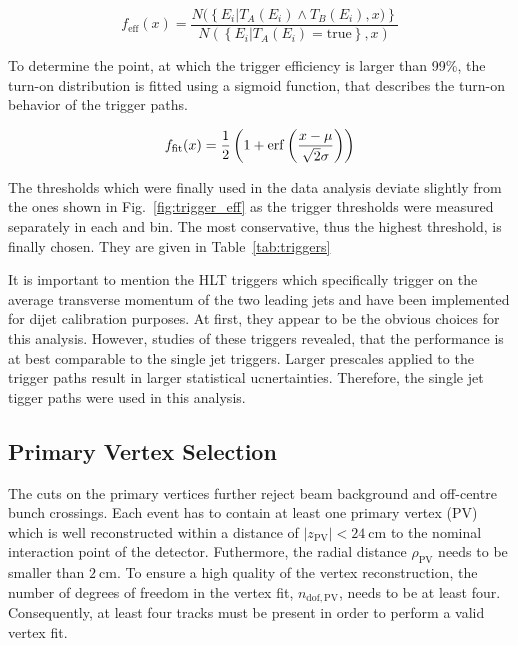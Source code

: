 \begin{equation}
\label{eq:trigger_eff}
    f_{\mathrm{eff}} (x) = \frac{N(\left\{E_i|T_A(E_i) \wedge T_B(E_i), x)\right\}}{N(\left\{ E_i | T_A(E_i) = \mathrm{true} \right\} , x)}
\end{equation}

To determine the point, at which the trigger efficiency is larger than 99\%, the
turn-on distribution is fitted using a sigmoid function, that describes the
turn-on behavior of the trigger paths.

\begin{equation}
\label{eq:trigger_eff_fit}
    f_{\mathrm{fit}} (x) = \frac{1}{2} \left( 1 + \operatorname{erf} \left(\frac{x-\mu}{\sqrt{2}\sigma}\right)\right)
\end{equation}

The thresholds which were finally used in the data analysis deviate slightly
from the ones shown in Fig.~\ref{fig:trigger_eff} as the trigger thresholds
were measured separately in each \ystar and \yboost bin. The most
conservative, thus the highest threshold, is finally chosen. They are given in
Table~\ref{tab:triggers}

It is important to mention the HLT triggers which specifically trigger on the
average transverse momentum of the two leading jets and have been implemented
for dijet calibration purposes. At first, they appear to be the obvious choices
for this analysis. However, studies of these triggers revealed, that the
performance is at best comparable to the single jet triggers. Larger prescales
applied to the \ptavg trigger paths result in larger statistical ucnertainties.
Therefore, the single jet tigger paths were used in this analysis.

\subsection{Primary Vertex Selection}

The cuts on the primary vertices further reject beam background and off-centre bunch
crossings. Each event has to contain at least one primary vertex (PV) which is well
reconstructed within a distance of $|z_\mathrm{PV}| < \SI{24}{\centi \meter}$ to
the nominal interaction point of the detector. Futhermore, the radial distance
$\rho_\mathrm{PV}$ needs to be smaller than $\SI{2}{\centi\meter}$. To
ensure a high quality of the vertex reconstruction, the number of
degrees of freedom in the vertex fit, $n_{\mathrm{dof,PV}}$, needs to be at least
four. Consequently, at least four tracks must be present in order to
perform a valid vertex fit.

